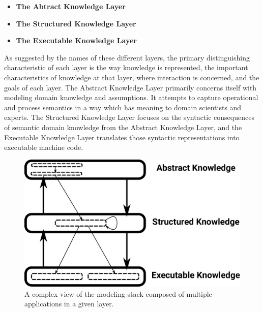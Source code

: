 \documentclass[11pt]{article}
\begin{document}
\begin{itemize}
\item \textbf{The Abtract Knowledge Layer}
\item \textbf{The Structured Knowledge Layer}
\item \textbf{The Executable Knowledge Layer}
\end{itemize}

As suggested by the names of these different layers, the primary
distinguishing characteristic of each layer is the way knowledge is
represented, the important characteristics of knowledge at that layer,
where interaction is concerned, and the goals of each layer.  The
Abstract Knowledge Layer primarily concerns itself with modeling
domain knowledge and assumptions.  It attempts to capture operational
and process semantics in a way which has meaning to domain scientists
and experts.  The Structured Knowledge Layer focuses on the syntactic
consequences of semantic domain knowledge from the Abstract Knowledge
Layer, and the Executable Knowledge Layer translates those syntactic
representations into executable machine code.

\begin{figure}
  \includegraphics[width=\textwidth]{figs/stack-diagram-2.pdf}
  \caption{A complex view of the modeling stack composed of multiple
    applications in a given layer.}
  \label{Fig:Stack2}
\end{figure}
\end{document}

